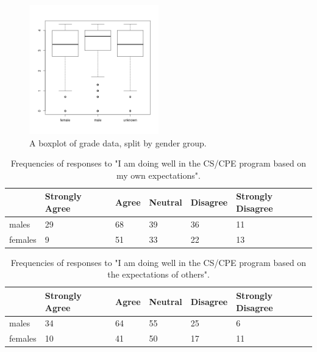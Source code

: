 \documentclass[a4paper,man,natbib]{apa6}
\begin{document}
\begin{figure}
\includegraphics[width=0.5\textwidth]{boxplot.png}
\caption{\label{fig:boxplot}A boxplot of grade data, split by gender group.}
\end{figure}

\begin{table}
\begin{tabular}{l|l|l|l|l|l}
		& Strongly Agree	& Agree	& Neutral	& Disagree	& Strongly Disagree \\\hline
males	& 29				& 68	& 39		& 36		& 11 \\
females & 9					& 51	& 33		& 22		& 13
\end{tabular}
\caption{\label{tab:expec-own}Frequencies of responses to "I am doing well in the CS/CPE program based on my own expectations".}
\end{table}

\begin{table}
\begin{tabular}{l|l|l|l|l|l}
		& Strongly Agree	& Agree	& Neutral	& Disagree	& Strongly Disagree \\\hline
males	& 34				& 64	& 55		& 25		& 6 \\
females & 10				& 41	& 50		& 17		& 11 
\end{tabular}
\caption{\label{tab:expec-other}Frequencies of responses to "I am doing well in the CS/CPE program based on the expectations of others".}
\end{table}


\end{document}
